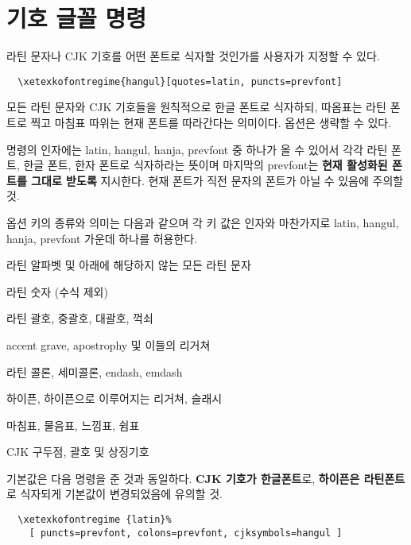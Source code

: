 \documentclass[a4paper]{article}
\def\hemph#1{\textsf{\bfseries #1}}
\def\hparen#1{{\small\hangulparens(#1)}}
\begin{document}
\section{기호 글꼴 명령}
라틴 문자나 CJK 기호를 어떤 폰트로 식자할 것인가를 사용자가 지정할 수 있다.
\begin{verbatim}
  \xetexkofontregime{hangul}[quotes=latin, puncts=prevfont]
\end{verbatim}
모든 라틴 문자와 CJK 기호들을 원칙적으로 한글 폰트로 식자하되,
따옴표는 라틴 폰트로 찍고 마침표 따위는 현재 폰트를 따라간다는 의미이다.
옵션은 생략할 수 있다.

명령의 인자에는 latin, hangul, hanja, prevfont 중 하나가 올 수 있어서
각각 라틴 폰트, 한글 폰트, 한자 폰트로 식자하라는 뜻이며
마지막의 prevfont는 \hemph{현재 활성화된 폰트를 그대로 받도록} 지시한다.
현재 폰트가 직전 문자의 폰트가 아닐 수 있음에 주의할 것.

옵션 키의 종류와 의미는 다음과 같으며 각 키 값은 인자와 마찬가지로
latin, hangul, hanja, prevfont 가운데 하나를 허용한다.
\begin{description}\itemsep0pt\hangulparens
\item[alphs] 라틴 알파벳 및 아래에 해당하지 않는 모든 라틴 문자
\item[nums] 라틴 숫자 \hparen{수식 제외}
\item[parens] 라틴 괄호, 중괄호, 대괄호, 꺽쇠
\item[quotes] accent grave, apostrophy 및 이들의 리거쳐
\item[colons] 라틴 콜론, 세미콜론, endash, emdash
\item[hyphens] 하이픈, 하이픈으로 이루어지는 리거쳐, 슬래시
\item[puncts] 마침표, 물음표, 느낌표, 쉼표
\item[cjksymbols] CJK 구두점, 괄호 및 상징기호
\end{description}

기본값은 다음 명령을 준 것과 동일하다. \hemph{CJK 기호가 한글폰트}로,
\hemph{하이픈은 라틴폰트}로
식자되게 기본값이 변경되었음에 유의할 것.
\begin{verbatim}
  \xetexkofontregime {latin}%
    [ puncts=prevfont, colons=prevfont, cjksymbols=hangul ]
\end{verbatim}
\end{document}
